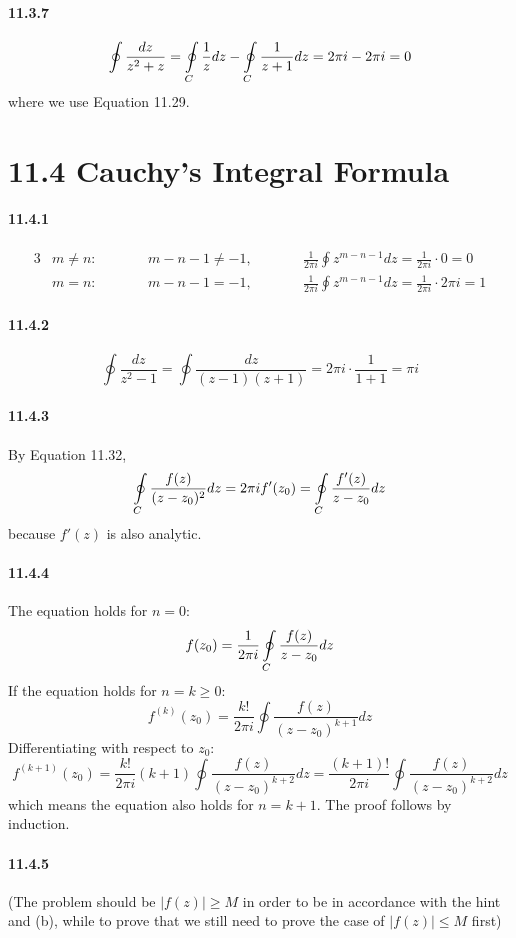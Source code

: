 \documentclass[a4paper]{article}
\begin{document}
\paragraph{11.3.7}
\[
\oint\displaylimits\frac{dz}{z^2+z}=\oint\displaylimits_C\frac{1}{z}dz-\oint\displaylimits_C\frac{1}{z+1}dz=2\pi i-2\pi i=0
\]
where we use Equation 11.29.

\section*{11.4 Cauchy’s Integral Formula}

\paragraph{11.4.1}
\begin{alignat*}{3}
    & m\neq n:\qquad && m-n-1\neq-1,\qquad && \frac{1}{2\pi i}\oint z^{m-n-1}dz=\frac{1}{2\pi i}\cdot0=0\\
    & m=n:\qquad && m-n-1=-1,\qquad && \frac{1}{2\pi i}\oint z^{m-n-1}dz=\frac{1}{2\pi i}\cdot2\pi i=1
\end{alignat*}

\paragraph{11.4.2}
\[
\oint\frac{dz}{z^2-1}=\oint\frac{dz}{(z-1)(z+1)}=2\pi i\cdot\frac{1}{1+1}=\pi i
\]

\paragraph{11.4.3}
By Equation 11.32,
\[
\oint\displaylimits_C\frac{f(z)}{(z-z_0)^2}dz=2\pi if'(z_0)=\oint\displaylimits_C\frac{f'(z)}{z-z_0}dz
\]
because $f'(z)$ is also analytic.

\paragraph{11.4.4}
The equation holds for $n=0$:
\[
f(z_0)=\frac{1}{2\pi i}\oint\displaylimits_C\frac{f(z)}{z-z_0}dz
\]
If the equation holds for $n=k\geq0$:
\[
f^{(k)}(z_0)=\frac{k!}{2\pi i}\oint\frac{f(z)}{(z-z_0)^{k+1}}dz
\]
Differentiating with respect to $z_0$:
\[
f^{(k+1)}(z_0)=\frac{k!}{2\pi i}(k+1)\oint\frac{f(z)}{(z-z_0)^{k+2}}dz=\frac{(k+1)!}{2\pi i}\oint\frac{f(z)}{(z-z_0)^{k+2}}dz
\]
which means the equation also holds for $n=k+1$. The proof follows by induction.  

\paragraph{11.4.5}
(The problem should be $|f(z)|\geq M$ in order to be in accordance with the hint and (b), while to prove that we still need to prove the case of $|f(z)|\leq M$ first)
\medskip
\end{document}

